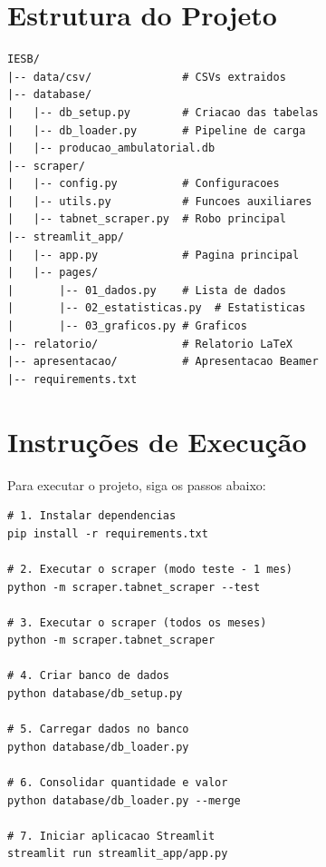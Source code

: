 \documentclass[
    12pt,
    oneside,
    a4paper,
    chapter=TITLE,
    section=TITLE
]{abntex2}
\begin{document}
\begin{apendicesenv}

\chapter{Estrutura do Projeto}

\begin{lstlisting}[caption={Estrutura de diretórios do projeto}]
IESB/
|-- data/csv/              # CSVs extraidos
|-- database/
|   |-- db_setup.py        # Criacao das tabelas
|   |-- db_loader.py       # Pipeline de carga
|   |-- producao_ambulatorial.db
|-- scraper/
|   |-- config.py          # Configuracoes
|   |-- utils.py           # Funcoes auxiliares
|   |-- tabnet_scraper.py  # Robo principal
|-- streamlit_app/
|   |-- app.py             # Pagina principal
|   |-- pages/
|       |-- 01_dados.py    # Lista de dados
|       |-- 02_estatisticas.py  # Estatisticas
|       |-- 03_graficos.py # Graficos
|-- relatorio/             # Relatorio LaTeX
|-- apresentacao/          # Apresentacao Beamer
|-- requirements.txt
\end{lstlisting}

\chapter{Instruções de Execução}

Para executar o projeto, siga os passos abaixo:

\begin{lstlisting}[caption={Instalação e execução}]
# 1. Instalar dependencias
pip install -r requirements.txt

# 2. Executar o scraper (modo teste - 1 mes)
python -m scraper.tabnet_scraper --test

# 3. Executar o scraper (todos os meses)
python -m scraper.tabnet_scraper

# 4. Criar banco de dados
python database/db_setup.py

# 5. Carregar dados no banco
python database/db_loader.py

# 6. Consolidar quantidade e valor
python database/db_loader.py --merge

# 7. Iniciar aplicacao Streamlit
streamlit run streamlit_app/app.py
\end{lstlisting}

\end{apendicesenv}
\end{document}
